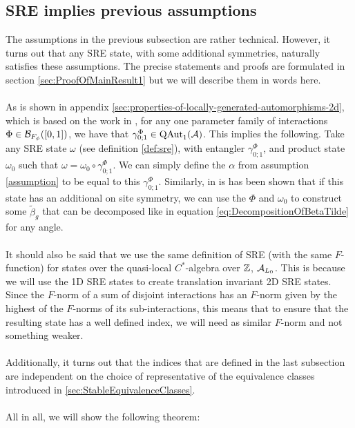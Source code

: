 \documentclass[11pt,a4paper,twoside]{article}
\numberwithin{equation}{section}
\begin{document}
	\subsection{SRE implies previous assumptions}\label{sec:Results_1}
	The assumptions in the previous subsection are rather technical. However, it turns out that any SRE state, with some additional symmetries, naturally satisfies these assumptions. The precise statements and proofs are formulated in section \ref{sec:ProofOfMainResult1} but we will describe them in words here.
	\\\\
	As is shown in appendix \ref{sec:properties-of-locally-generated-automorphisms-2d}, which is based on the work in \cite{ogata2021h3gmathbb}, for any one parameter family of interactions $\Phi\in\BB_{F_\phi}([0,1])$, we have that $\gamma^\Phi_{0;1}\in\QAut{\AA}$. This implies the following. Take any SRE state $\omega$ (see definition \ref{def:sre}), with entangler $\gamma^\Phi_{0;1}$, and product state $\omega_0$ such that $\omega=\omega_0\circ \gamma^\Phi_{0;1}$. We can simply define the $\alpha$ from assumption \ref{assumption} to be equal to this $\gamma^\Phi_{0;1}$. Similarly, in \cite{ogata2021h3gmathbb} is has been shown that if this state has an additional on site symmetry, we can use the $\Phi$ and $\omega_0$ to construct some $\tilde\beta_g$ that can be decomposed like in equation \eqref{eq:DecompositionOfBetaTilde} for any angle.
	\\\\
	It should also be said that we use the same definition of SRE (with the same $F$-function) for states over the quasi-local $C^*$-algebra over $\ZZ$, $\AA_{L_0}$. This is because we will use the 1D SRE states to create translation invariant 2D SRE states. Since the $F$-norm of a sum of disjoint interactions has an $F$-norm given by the highest of the $F$-norms of its sub-interactions, this means that to ensure that the resulting state has a well defined index, we will need as similar $F$-norm and not something weaker.
	\\\\
	Additionally, it turns out that the indices that are defined in the last subsection are independent on the choice of representative of the equivalence classes introduced in \ref{sec:StableEquivalenceClasses}.
	\\\\
	All in all, we will show the following theorem:
\end{document}
